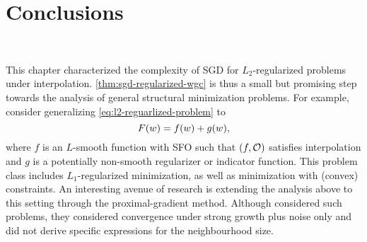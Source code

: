 \section{Conclusions}~\label{sec:beyond-interp-conclusions}

This chapter characterized the complexity of \ac{SGD} for \( L_2 \)-regularized problems under interpolation.
\autoref{thm:sgd-regularized-wgc} is thus a small but promising step towards the analysis of general structural minimization problems.
For example, consider generalizing \autoref{eq:l2-reguarlized-problem} to 
\[ F(\w) = f(\w) + g(\w), \]
where \( f \) is an \( L \)-smooth function with \ac{SFO} \oracle{} such that \( \rbr{f, \oracle{}} \) satisfies interpolation and \( g \) is a potentially non-smooth regularizer or indicator function. 
This problem class includes \( L_1 \)-regularized minimization, as well as minimization with (convex) constraints.
An interesting avenue of research is extending the analysis above to this setting through the proximal-gradient method.
Although \citet{cevher2018linear} considered such problems, they considered convergence under strong growth plus noise only and did not derive specific expressions for the neighbourhood size.

